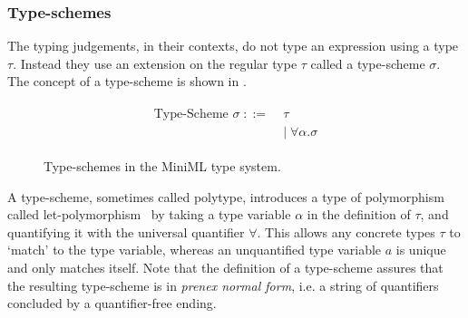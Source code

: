 \subsubsection{Type-schemes}
The typing judgements, in their contexts, do not type an expression using a type $\tau$. Instead they use an extension on the regular type $\tau$ called a type-scheme $\sigma$.
The concept of a type-scheme is shown in .

\begin{figure}[!htb]
\begin{align*}
\begin{aligned}
\text{Type-Scheme } \sigma \; ::= \; &\tau \\
&| \; \forall \alpha . \sigma
\end{aligned}
\end{align*}
\caption[Type Schemes]{Type-schemes in the MiniML type system.}
\label{fig:MiniMLTypeSchemes}
\end{figure}

A type-scheme, sometimes called polytype, introduces a type of polymorphism called let-poly\-morphism~\cite{Pierce} by taking a type variable $\alpha$ in the definition of $\tau$, and quantifying it with the universal quantifier $\forall$.
This allows any concrete types $\tau$ to `match' to the type variable, whereas an unquantified type variable $a$ is unique and only matches itself.
Note that the definition of a type-scheme assures that the resulting type-scheme is in \emph{prenex normal form}, i.e. a string of quantifiers concluded by a quantifier-free ending.


